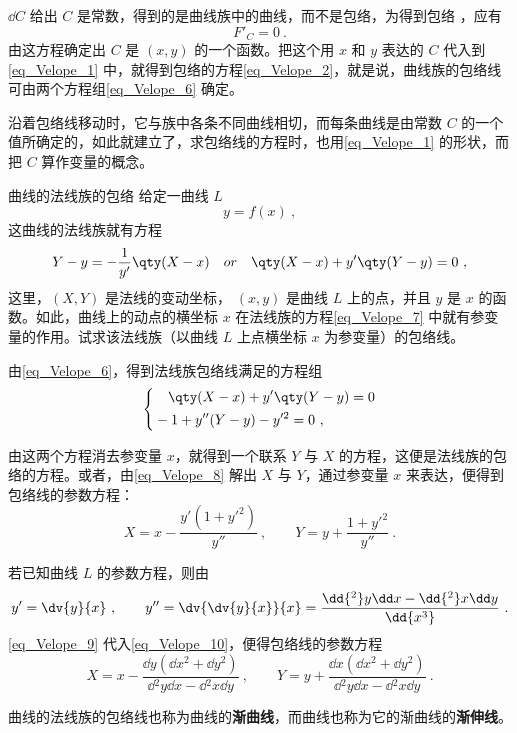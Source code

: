 $\dd C$ 给出 $C$ 是常数，得到的是曲线族中的曲线，而不是包络，为得到包络
，应有
\begin{equation}
F'_C=0~.
\end{equation}
由这方程确定出 $C$ 是 $(x,y)$ 的一个函数。把这个用 $x$ 和 $y$ 表达的 $C$ 代入到\autoref{eq_Velope_1} 中，就得到包络的方程\autoref{eq_Velope_2}，就是说，曲线族的包络线可由两个方程组\autoref{eq_Velope_6} 确定。

沿着包络线移动时，它与族中各条不同曲线相切，而每条曲线是由常数 $C$ 的一个值所确定的，如此就建立了，求包络线的方程时，也用\autoref{eq_Velope_1} 的形状，而把 $C$ 算作变量的概念。
\begin{example}{曲线的法线族的包络}
给定一曲线 $L$
\begin{equation}
y=f(x)~,
\end{equation}
这曲线的法线族就有方程
\begin{equation}\label{eq_Velope_7}
Y-y=-\frac{1}{y'}\qty(X-x)\quad or\quad\qty(X-x)+y'\qty(Y-y)=0~,
\end{equation}
这里，$(X,Y)$ 是法线的变动坐标， $(x,y)$ 是曲线 $L$ 上的点，并且 $y$ 是 $x$ 的函数。如此，曲线上的动点的横坐标 $x$ 在法线族的方程\autoref{eq_Velope_7} 中就有参变量的作用。试求该法线族（以曲线 $L$ 上点横坐标 $x$ 为参变量）的包络线。

由\autoref{eq_Velope_6}，得到法线族包络线满足的方程组
\begin{equation}\label{eq_Velope_8}
\left\{\begin{aligned}
&\quad\qty(X-x)+y'\qty(Y-y)=0\\
&-1+y''(Y-y)-y'^2=0~,
\end{aligned}\right.
\end{equation}
 

由这两个方程消去参变量 $x$，就得到一个联系 $Y$ 与 $X$ 的方程，这便是法线族的包络的方程。或者，由\autoref{eq_Velope_8} 解出 $X$ 与 $Y$，通过参变量 $x$ 来表达，便得到包络线的参数方程：
\begin{equation}\label{eq_Velope_10}
X=x-\frac{y'(1+y'^2)}{y''}~,\qquad Y=y+\frac{1+y'^2}{y''}~.
\end{equation}

若已知曲线 $L$ 的参数方程，则由
\begin{equation}\label{eq_Velope_9}
y'=\dv{y}{x}~,\qquad y''=\dv{\dv{y}{x}}{x}=\frac{\dd{^2}y\dd x-\dd{^2}x\dd y}{\dd{x^3}}~.
\end{equation}
\autoref{eq_Velope_9} 代入\autoref{eq_Velope_10}，便得包络线的参数方程
\begin{equation}
X=x-\frac{\dd y(\dd x^2+\dd y^2)}{\dd{^2y\dd x}-\dd{^2x}\dd y}~,
\qquad Y=y+\frac{\dd x(\dd x^2+\dd y^2)}{\dd{^2y}\dd x-\dd{^2x}\dd y}~.
\end{equation}

曲线的法线族的包络线也称为曲线的\textbf{渐曲线}，而曲线也称为它的渐曲线的\textbf{渐伸线}。
\end{example}
